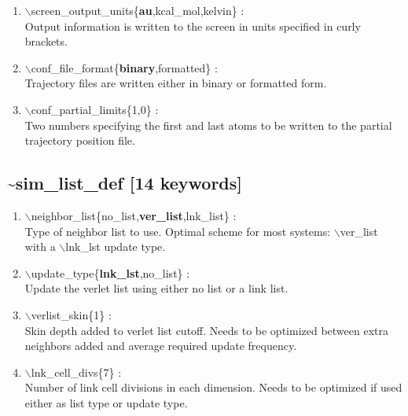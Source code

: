 \documentclass[12pt,titlepage]{article}
\begin{document}
\begin{enumerate}
 \vspace{0.15in} 
 \item   $\backslash$screen\_output\_units\{{\bf au},kcal\_mol,kelvin\} : \\
   Output information is written to the screen in units specified 
   in curly brackets.

 \vspace{0.15in} 
 \item   $\backslash$conf\_file\_format\{{\bf binary},formatted\} : \\
   Trajectory files are written either in binary or formatted form.

 \vspace{0.15in} 
 \item   $\backslash$conf\_partial\_limits\{1,0\} : \\
   Two numbers specifying the first and last atoms to be written to
   the partial trajectory position file.

\end{enumerate}

\newpage
\subsection*{\bf \~{}sim\_list\_def [14 keywords]}

\begin{enumerate}

 \vspace{0.15in} 
 \item   $\backslash$neighbor\_list\{no\_list,{\bf ver\_list},lnk\_list\} : \\
   Type of neighbor list to use.  Optimal scheme for most systems: 
   $\backslash$ver\_list with a $\backslash$lnk\_lst update type.

 \vspace{0.15in} 
 \item   $\backslash$update\_type\{{\bf lnk\_lst},no\_list\} : \\
   Update the verlet list using either no list or a link list.

 \vspace{0.15in} 
 \item   $\backslash$verlist\_skin\{1\} : \\
   Skin depth added to verlet list cutoff.  Needs to be optimized between
   extra neighbors added and average required update frequency.

 \vspace{0.15in} 
 \item   $\backslash$lnk\_cell\_divs\{7\} : \\
   Number of link cell divisions in each dimension.  Needs to be optimized
   if used either as list type or update type.

\end{enumerate}
\end{document}
